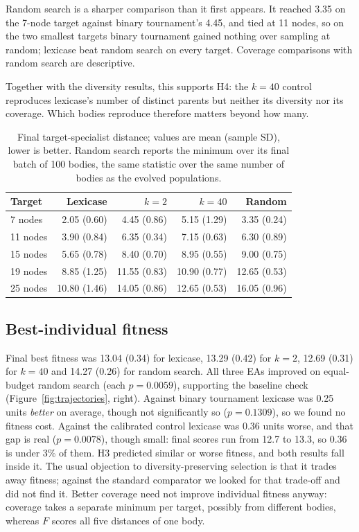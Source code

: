 \documentclass[sigconf]{acmart}
\begin{document}
Random search is a sharper comparison than it first appears. It reached 3.35 on the 7-node target against binary tournament's 4.45, and tied at 11 nodes, so on the two smallest targets binary tournament gained nothing over sampling at random; lexicase beat random search on every target. Coverage comparisons with random search are descriptive.

Together with the diversity results, this supports H4: the $k=40$ control reproduces lexicase's number of distinct parents but neither its diversity nor its coverage. Which bodies reproduce therefore matters beyond how many.

\begin{table}[t]
\caption{Final target-specialist distance; values are mean (sample SD), lower is better. Random search reports the minimum over its final batch of 100 bodies, the same statistic over the same number of bodies as the evolved populations.}
\label{tab:coverage}
\centering
\scriptsize
\begin{tabular}{@{}lrrrr@{}}
\toprule
Target & Lexicase & $k=2$ & $k=40$ & Random \\
\midrule
7 nodes  & 2.05 (0.60) & 4.45 (0.86) & 5.15 (1.29) & 3.35 (0.24) \\
11 nodes & 3.90 (0.84) & 6.35 (0.34) & 7.15 (0.63) & 6.30 (0.89) \\
15 nodes & 5.65 (0.78) & 8.40 (0.70) & 8.95 (0.55) & 9.00 (0.75) \\
19 nodes & 8.85 (1.25) & 11.55 (0.83) & 10.90 (0.77) & 12.65 (0.53) \\
25 nodes & 10.80 (1.46) & 14.05 (0.86) & 12.65 (0.53) & 16.05 (0.96) \\
\bottomrule
\end{tabular}
\end{table}

\subsection{Best-individual fitness}

Final best fitness was 13.04 (0.34) for lexicase, 13.29 (0.42) for $k=2$, 12.69 (0.31) for $k=40$ and 14.27 (0.26) for random search. All three EAs improved on equal-budget random search (each $p=0.0059$), supporting the baseline check (Figure~\ref{fig:trajectories}, right). Against binary tournament lexicase was 0.25 units \emph{better} on average, though not significantly so ($p=0.1309$), so we found no fitness cost. Against the calibrated control lexicase was 0.36 units worse, and that gap is real ($p=0.0078$), though small: final scores run from 12.7 to 13.3, so 0.36 is under 3\% of them. H3 predicted similar or worse fitness, and both results fall inside it. The usual objection to diversity-preserving selection is that it trades away fitness; against the standard comparator we looked for that trade-off and did not find it. Better coverage need not improve individual fitness anyway: coverage takes a separate minimum per target, possibly from different bodies, whereas $F$ scores all five distances of one body.
\end{document}
